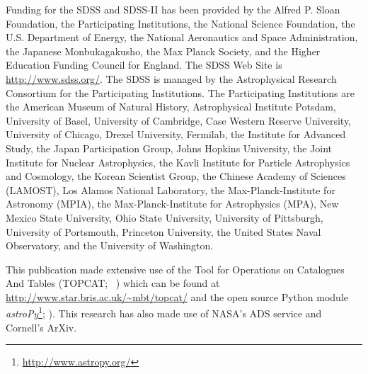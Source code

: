 \documentclass[useAMS,usenatbib]{mn2e}
\begin{document}
Funding for the SDSS and SDSS-II has been provided by the Alfred P. Sloan Foundation, the Participating Institutions, the National Science Foundation, the U.S. Department of Energy, the National Aeronautics and Space Administration, the Japanese Monbukagakusho, the Max Planck Society, and the Higher Education Funding Council for England. The SDSS Web Site is \url{http://www.sdss.org/}.
The SDSS is managed by the Astrophysical Research Consortium for the Participating Institutions. The Participating Institutions are the American Museum of Natural History, Astrophysical Institute Potsdam, University of Basel, University of Cambridge, Case Western Reserve University, University of Chicago, Drexel University, Fermilab, the Institute for Advanced Study, the Japan Participation Group, Johns Hopkins University, the Joint Institute for Nuclear Astrophysics, the Kavli Institute for Particle Astrophysics and Cosmology, the Korean Scientist Group, the Chinese Academy of Sciences (LAMOST), Los Alamos National Laboratory, the Max-Planck-Institute for Astronomy (MPIA), the Max-Planck-Institute for Astrophysics (MPA), New Mexico State University, Ohio State University, University of Pittsburgh, University of Portsmouth, Princeton University, the United States Naval Observatory, and the University of Washington.

This publication made extensive use of the Tool for Operations on Catalogues And Tables (TOPCAT; ~\citealt{taylor05}) which can be found at \url{http://www.star.bris.ac.uk/~mbt/topcat/} and the open source Python module \emph{astroPy}\footnote{\url{http://www.astropy.org/}}; \citealt{astropy13}). This research has also made use of NASA's ADS service and Cornell's ArXiv. 


  
\end{document}

